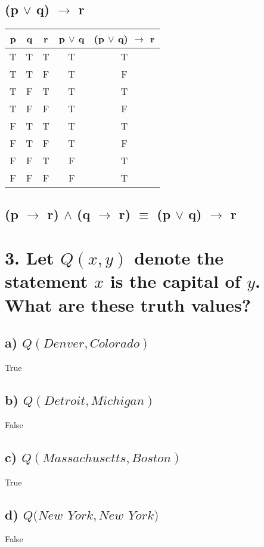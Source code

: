 \documentclass[11pt, oneside]{article} %
\numberwithin{equation}{section} %
\numberwithin{figure}{section} %
\begin{document}
\begin{table}[!htp]
\subsection{(p $\vee$ q) $\rightarrow$ r}
\begin{tabular}{c c c c c}
\hline\hline
p & q & r & p $\vee$ q & (p $\vee$ q) $\rightarrow$ r \\ [0.5ex] %
\hline
T & T & T & T & T\\
T & T & F & T & F\\
T & F & T & T & T\\
T & F & F & T & F\\
F & T & T & T & T\\
F & T & F & T & F\\
F & F & T & F & T\\
F & F & F & F & T\\ [1ex]
\hline
\end{tabular}
\label{table:nonlin}
\subsection{(p $\rightarrow$ r) $\wedge$ (q $\rightarrow$ r) $\equiv$ (p $\vee$ q) $\rightarrow$ r}
\end{table}

\begin{table}[!htp]
\section{}
\section{3. Let $Q(x, y)$ denote the statement $x$ is the capital of $y$. What are these truth values?}
\subsection{a) $Q(Denver, Colorado)$}
True
\subsection{b) $Q(Detroit, Michigan)$}
False
\subsection{c) $Q(Massachusetts, Boston)$}
True
\subsection{d) $Q(New$ $York, New$ $York)$}
False

\end{table}
\end{document}
